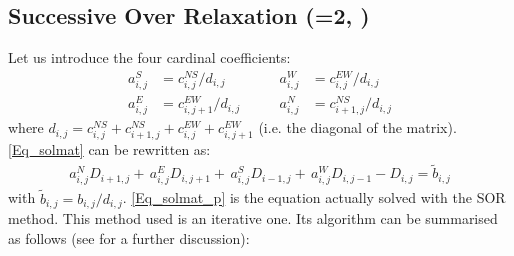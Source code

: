 \documentclass[NEMO_book]{subfiles}
\begin{document}
\subsection{Successive Over Relaxation (=2, )}
\label{MISC_solsor}

Let us introduce the four cardinal coefficients: 
\begin{align*}
a_{i,j}^S &= c_{i,j    }^{NS}/d_{i,j}     &\qquad  a_{i,j}^W &= c_{i,j}^{EW}/d_{i,j}       \\
a_{i,j}^E &= c_{i,j+1}^{EW}/d_{i,j}    &\qquad   a_{i,j}^N &= c_{i+1,j}^{NS}/d_{i,j}   
\end{align*}
where $d_{i,j} = c_{i,j}^{NS}+ c_{i+1,j}^{NS} + c_{i,j}^{EW} + c_{i,j+1}^{EW}$ 
(i.e. the diagonal of the matrix). \eqref{Eq_solmat} can be rewritten as:
\begin{equation}  \label{Eq_solmat_p}
\begin{split}
a_{i,j}^{N}  D_{i+1,j} +\,a_{i,j}^{E}  D_{i,j+1} +\, a_{i,j}^{S}  D_{i-1,j} +\,a_{i,j}^{W} D_{i,j-1}  -  D_{i,j} = \tilde{b}_{i,j}
\end{split}
\end{equation}
with $\tilde b_{i,j} = b_{i,j}/d_{i,j}$. \eqref{Eq_solmat_p} is the equation actually solved 
with the SOR method. This method used is an iterative one. Its algorithm can be 
summarised as follows (see \citet{Haltiner1980} for a further discussion):
\end{document}
